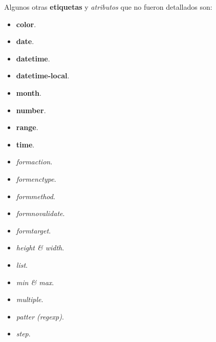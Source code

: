 Algunos otras \textbf{etiquetas} y \textit{atributos} que no fueron detallados son:
\begin{itemize}
    \item \textbf{color}.
    \item \textbf{date}.
    \item \textbf{datetime}.
    \item \textbf{datetime-local}.
    \item \textbf{month}.
    \item \textbf{number}.
    \item \textbf{range}.
    \item \textbf{time}.
    \item \textit{formaction}.
    \item \textit{formenctype}.
    \item \textit{formmethod}.
    \item \textit{formnovalidate}.
    \item \textit{formtarget}.
    \item \textit{height \& width}.
    \item \textit{list}.
    \item \textit{min \& max}.
    \item \textit{multiple}.
    \item \textit{patter (regexp)}.
    \item \textit{step}.
\end{itemize}
